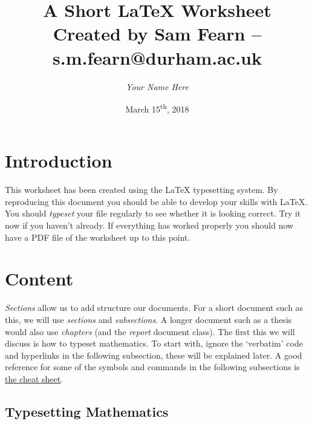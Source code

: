 \documentclass{article}
\author{\emph{Your Name Here}}
\title{A Short \LaTeX{} Worksheet \\ \small Created by Sam Fearn -- s.m.fearn@durham.ac.uk}
\date{March 15\textsuperscript{th}, 2018}
\begin{document}
\maketitle
\section{Introduction}
\label{sec:introduction}
This worksheet has been created using the \LaTeX{} typesetting system. By reproducing this document you should be able to develop your skills with \LaTeX{}. You should \emph{typeset} your file regularly to see whether it is looking correct. Try it now if you haven't already. If everything has worked properly you should now have a PDF file of the worksheet up to this point. 

\section{Content}
\label{sec:content}

\emph{Sections} allow us to add structure our documents. For a short document such as this, we will use \emph{sections} and \emph{subsections}. A longer document such as a thesis would also use \emph{chapters} (and the \emph{report} document class). The first this we will discuss is how to typeset mathematics. To start with, ignore the `verbatim' code and hyperlinks in the following subsection, these will be explained later. A good reference for some of the symbols and commands in the following subsections is \href{https://wch.github.io/latexsheet/latexsheet.pdf}{the \LaTeXe{} cheat sheet}.

\subsection{Typesetting Mathematics}
\label{sub:typesetting_mathematics}
\end{document}
